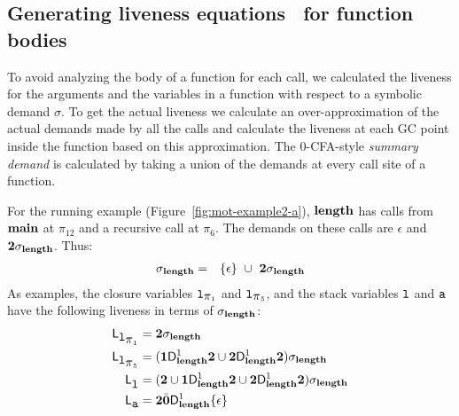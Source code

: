 \documentclass[preprint, 9pt]{sigplanconf}
\begin{document}
\subsection{Generating liveness equations \Lv\  for function bodies}
\label{sec:bodylivenessbodies}

To  avoid analyzing  the body  of a  function for  each
call, we calculated the  liveness for the arguments and
the variables in a function  with respect to a symbolic
demand  $\sigma$.   To  get   the  actual  liveness  we
calculate an  over-approximation of the  actual demands
made by  all the  calls and  calculate the  liveness at
each  GC  point  inside  the  function  based  on  this
approximation.  The 0-CFA-style {\em summary demand} is
calculated by  taking a union  of the demands  at every
call site of a function.



For  the  running  example (Figure~\ref{fig:mot-example2-a}),  $\mathbf{length}$  has  calls  from  $\mathbf{main}$  at
$\pi_{12}$ and a recursive call at $\pi_6$. The demands on these calls
are $\epsilon$ and ${\mathbf{2}}\sigma_{\mathit{\mathbf{length}}}$. Thus:
\begin{eqnarray*}
\sigma_{\mathbf{length}}    &=&
 \{\epsilon\}  ~\cup~{{\mathbf{2}}\sigma_{\mathit{\mathbf{length}}}}
\end{eqnarray*}
As examples, the closure variables $\mbox{\tt l}_{\mbox{$\pi$}_1}$ and $\mbox{\tt l}_{\mbox{$\pi$}_5}$, and the
stack variables $\mbox{\tt l}$ and $\mbox{\tt a}$ have the following liveness in terms
of  $\sigma_{\mathbf{length}}$:
\begin{align*}
  \mathsf{L}_{\mbox{\tt l}_{\mbox{$\pi$}_1}} &= {\mathbf{2}}\sigma_{\mathit{\mathbf{length}}} \\
  \mathsf{L}_{\mbox{\tt l}_{\mbox{$\pi$}_5}} &=  (\mathbf{1}\mathsf{D}_{\mathit {\mathbf{length}}}^{1}{{\mathbf{2}}} \cup
  {\mathbf{2}}\mathsf{D}_{\mathit {\mathbf{length}}}^{1}{{\mathbf{2}}}) \sigma_{\mathit{\mathbf{length}}} \\
  \mathsf{L}_{{\mbox{\tt l}}}^{} &= ({\mathbf{2}} \cup \mathbf{1}\mathsf{D}_{\mathit {\mathbf{length}}}^{1}{\mathbf{2}}
  \cup {\mathbf{2}}\mathsf{D}_{\mathit {\mathbf{length}}}^{1}{{\mathbf{2}}})\sigma_{\mathit{\mathbf{length}}} \\
  \mathsf{L}_{{\mbox{\tt a}}}^{} &= {\mathbf{2}} \bar{\mathbf{0}} \mathsf{D}_{\mathit {\mathbf{length}}}^{1}\{\epsilon\}
\end{align*}
\end{document}
